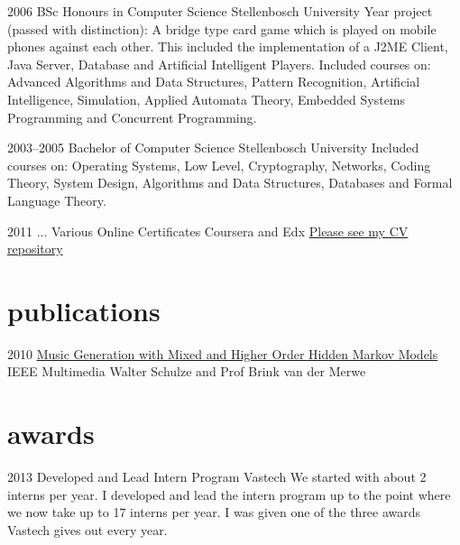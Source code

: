 \documentclass[]{friggeri-cv} %
\begin{document}
\begin{entrylist}

\entry
{2006}
{BSc Honours {\normalfont in Computer Science}}
{Stellenbosch University}
{Year project (passed with distinction): A bridge type card game which is played on mobile phones against each other. This included the implementation of a J2ME Client, Java Server, Database and Artificial Intelligent Players.
Included courses on: Advanced Algorithms and Data Structures, Pattern Recognition, Artificial Intelligence, Simulation, Applied Automata Theory, Embedded Systems Programming and Concurrent Programming.}

\entry
{2003--2005}
{Bachelor {\normalfont of Computer Science}}
{Stellenbosch University}
{Included courses on: Operating Systems, Low Level, Cryptography, Networks, Coding Theory, System Design, Algorithms and Data Structures, Databases and Formal Language Theory.}

\entry
{2011 ...}
{Various Online Certificates}
{Coursera and Edx}
{\href{https://github.com/awalterschulze/waltercv}{Please see my CV repository}}

\end{entrylist}

\section{publications}


\begin{entrylist}

\entry
{2010}
{\href{http://doi.ieeecomputersociety.org/10.1109/MMUL.2010.44}{Music Generation with Mixed and Higher Order Hidden Markov Models}}
{IEEE Multimedia}
{Walter Schulze and Prof Brink van der Merwe}

\end{entrylist}

\newpage

\section{awards}

\begin{entrylist}

\entry
{2013}
{Developed and Lead Intern Program}
{Vastech}
{We started with about 2 interns per year. I developed and lead the intern program up to the point where we now take up to 17 interns per year.  I was given one of the three awards Vastech gives out every year.}

\end{entrylist}
\end{document}
